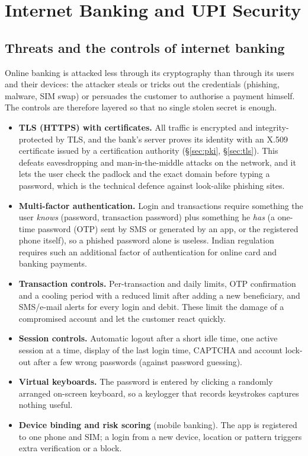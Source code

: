 \section{Internet Banking and UPI Security}\label{sec:upi}

\subsection{Threats and the controls of internet banking \new}

Online banking is attacked less through its cryptography than through its users and their devices: the attacker steals or tricks out the credentials (phishing, malware, SIM swap) or persuades the customer to authorise a payment himself. The controls are therefore layered so that no single stolen secret is enough.
\begin{itemize}[leftmargin=1.4em]
  \item \textbf{TLS (HTTPS) with certificates.} All traffic is encrypted and integrity-protected by TLS, and the bank's server proves its identity with an X.509 certificate issued by a certification authority (\S\ref{sec:pki}, \S\ref{sec:tls}). This defeats eavesdropping and man-in-the-middle attacks on the network, and it lets the user check the padlock and the exact domain before typing a password, which is the technical defence against look-alike phishing sites.
  \item \textbf{Multi-factor authentication.} Login and transactions require something the user \emph{knows} (password, transaction password) plus something he \emph{has} (a one-time password (OTP) sent by SMS or generated by an app, or the registered phone itself), so a phished password alone is useless. Indian regulation requires such an additional factor of authentication for online card and banking payments.
  \item \textbf{Transaction controls.} Per-transaction and daily limits, OTP confirmation and a cooling period with a reduced limit after adding a new beneficiary, and SMS/e-mail alerts for every login and debit. These limit the damage of a compromised account and let the customer react quickly.
  \item \textbf{Session controls.} Automatic logout after a short idle time, one active session at a time, display of the last login time, CAPTCHA and account lock-out after a few wrong passwords (against password guessing).
  \item \textbf{Virtual keyboards.} The password is entered by clicking a randomly arranged on-screen keyboard, so a keylogger that records keystrokes captures nothing useful.
  \item \textbf{Device binding and risk scoring} (mobile banking). The app is registered to one phone and SIM; a login from a new device, location or pattern triggers extra verification or a block.
\end{itemize}
